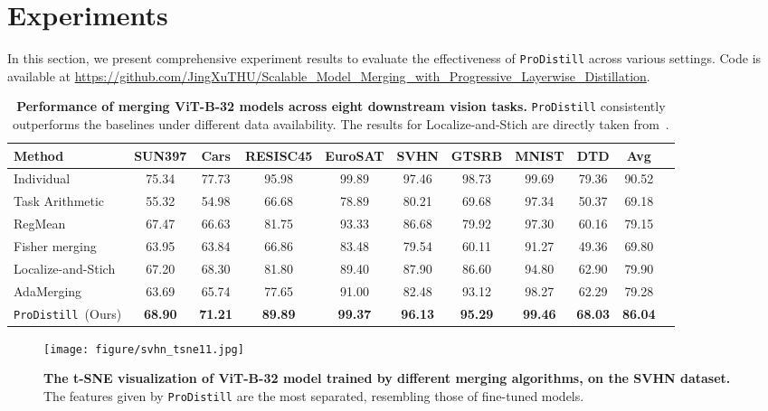 \section{Experiments}
\label{sec:exps}

In this section, we present comprehensive experiment results to evaluate the effectiveness of \texttt{ProDistill} across various settings. Code is available at \url{https://github.com/JingXuTHU/Scalable_Model_Merging_with_Progressive_Layerwise_Distillation}.

\begin{table*}[t]
\setlength{\tabcolsep}{4pt}
\centering
\caption{\textbf{Performance of merging ViT-B-32 models across eight downstream vision tasks.} \texttt{ProDistill} consistently outperforms the baselines under different data availability. The results for Localize-and-Stich are directly taken from~\citet{he2024localize}.}
\label{tab:vitb32}   
\begin{tabular}{l|cccccccc|cc}
\toprule
\textbf{Method} &\textbf{SUN397}& \textbf{Cars}& \textbf{RESISC45}& \textbf{EuroSAT}& \textbf{SVHN}& \textbf{GTSRB}& \textbf{MNIST}& \textbf{DTD} &\textbf{Avg}  \\
\midrule
{Individual}  & 75.34 & 77.73 & 95.98 & 99.89 & 97.46 & 98.73 & 99.69 & 79.36 & 90.52 \\
Task Arithmetic & 55.32 & 54.98 & 66.68 & 78.89 & 80.21 & 69.68 & 97.34 & 50.37 & 69.18 \\
\midrule
RegMean& 67.47 & 66.63 & 81.75 & 93.33 & 86.68 & 79.92 & 97.30 & 60.16 & 79.15 \\
Fisher merging & 63.95 & 63.84 & 66.86 & 83.48 & 79.54 & 60.11 & 91.27 & 49.36 & 69.80 \\
Localize-and-Stich  & 67.20 & 68.30 & 81.80 & 89.40 & 87.90 & 86.60 & 94.80 & 62.90 & 79.90 \\
AdaMerging& 63.69 & 65.74 & 77.65 & 91.00 & 82.48 & 93.12 & 98.27 & 62.29 & 79.28 \\ 
\rowcolor{lightyellow}
\texttt{ProDistill}~(Ours)& \textbf{68.90} & \textbf{71.21} & \textbf{89.89} & \textbf{99.37} & \textbf{96.13} & \textbf{95.29} & \textbf{99.46} & \textbf{68.03} & \textbf{86.04} \\
\bottomrule
\end{tabular}
\end{table*}

\begin{figure*}
    \centering
    \texttt{[image: figure/svhn\_tsne11.jpg]}
    \caption{\textbf{The t-SNE visualization of ViT-B-32 model trained by different merging algorithms, on the SVHN dataset.} The features given by \texttt{ProDistill}  are the most separated, resembling those of fine-tuned models.}
    \label{fig:tsne_svhn}
\end{figure*}

